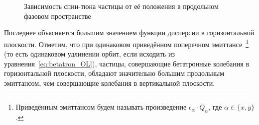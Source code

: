 \begin{figure}[H]
	\centering
	\caption{Зависимость спин-тюна частицы от её положения в продольном фазовом пространстве\label{fig:main}}
\end{figure}

Последнее объясняется большим значением функции дисперсии в горизонтальной плоскости. Отметим, что при одинаковом приведённом поперечном эмиттансе~\footnote{Приведённым эмиттансом будем называть произведение $\epsilon_\alpha\cdot Q_\alpha$, где $\alpha\in\{x,y\}$.} (то есть одинаковом удлинении орбит, если исходить из уравнения~\eqref{eq:betatron_OL}), частицы, совершающие бетатронные колебания в горизонтальной плоскости, обладают значительно большим продольным эмиттансом, чем совершающие колебания в вертикальной плоскости.

